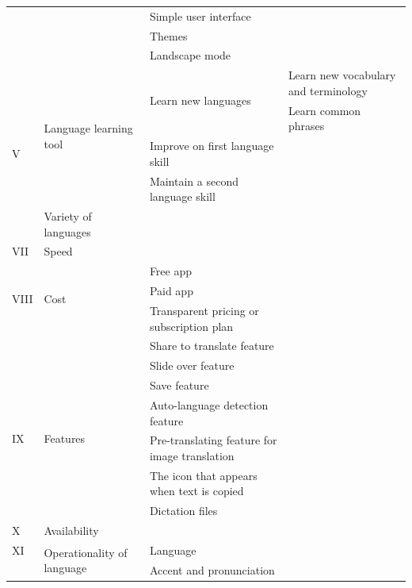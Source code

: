 \documentclass[english]{textolivre}
\begin{document}
\begin{longtable}{p{1cm} p{2.5cm} p{4.5cm} p{5cm}}
\cmidrule{3-4}
& & Simple user interface & \cellcolor[HTML]{EFEFEF} \\
\cmidrule{3-4}
& & Themes & \cellcolor[HTML]{EFEFEF} \\ 
\cmidrule{3-4}
& & Landscape mode & \cellcolor[HTML]{EFEFEF} \\ 
\midrule
\multirow{5}{=}{V} & \multirow{4}{=}{Language learning tool} & \multirow{2}{=}{Learn new languages} & Learn new vocabulary and terminology \\
& & & Learn common phrases \\
\cmidrule{3-4}
& & Improve on first language skill & \cellcolor[HTML]{EFEFEF} \\
\cmidrule{3-4}
& & Maintain a second language skill & \cellcolor[HTML]{EFEFEF} \\
\midrule
VI & Variety of languages & \cellcolor[HTML]{EFEFEF} & \cellcolor[HTML]{EFEFEF} \\
\midrule
VII & Speed & \cellcolor[HTML]{EFEFEF} & \cellcolor[HTML]{EFEFEF} \\
\midrule
\multirow{3}{=}{VIII} & \multirow{3}{=}{Cost} & Free app & \cellcolor[HTML]{EFEFEF} \\
\cmidrule{3-4}
& & Paid app & \cellcolor[HTML]{EFEFEF} \\
\cmidrule{3-4}
& & Transparent pricing or subscription plan & \cellcolor[HTML]{EFEFEF} \\
\midrule
 &  & Share to translate feature & \cellcolor[HTML]{EFEFEF} \\
\cmidrule{3-4}
\multirow{6}{=}{IX} & \multirow{6}{=}{Features} & Slide over feature & \cellcolor[HTML]{EFEFEF} \\
\cmidrule{3-4}
& & Save feature & \cellcolor[HTML]{EFEFEF} \\
\cmidrule{3-4}
& & Auto-language detection feature & \cellcolor[HTML]{EFEFEF} \\
\cmidrule{3-4}
& & Pre-translating feature for image translation & \cellcolor[HTML]{EFEFEF} \\
\cmidrule{3-4}
& & The icon that appears when text is copied & \cellcolor[HTML]{EFEFEF} \\
\cmidrule{3-4}
& & Dictation files & \cellcolor[HTML]{EFEFEF} \\
\midrule
X & Availability & \cellcolor[HTML]{EFEFEF} & \cellcolor[HTML]{EFEFEF} \\
\midrule
XI & \multirow{2}{=}{Operationality of language} & Language & \cellcolor[HTML]{EFEFEF} \\
\cmidrule{3-4}
& & Accent and pronunciation & \cellcolor[HTML]{EFEFEF} \\

\end{longtable}
\end{document}
